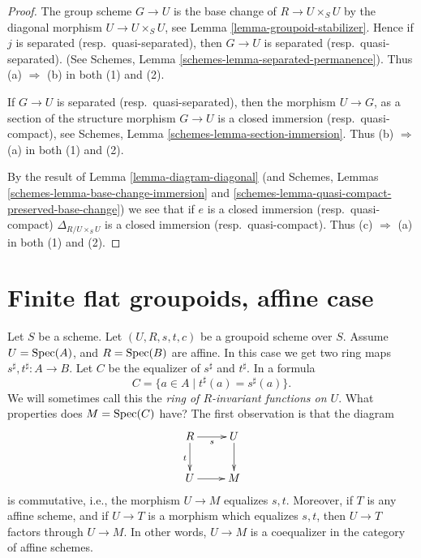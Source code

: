 \begin{proof}
The group scheme $G \to U$ is the base change of $R \to U \times_S U$
by the diagonal morphism $U \to U \times_S U$, see
Lemma \ref{lemma-groupoid-stabilizer}. Hence if
$j$ is separated (resp.\ quasi-separated),
then $G \to U$ is separated (resp.\ quasi-separated).
(See Schemes, Lemma
\ref{schemes-lemma-separated-permanence}).
Thus (a) $\Rightarrow$ (b) in both (1) and (2).

\medskip\noindent
If $G \to U$ is separated (resp.\ quasi-separated), then the morphism
$U \to G$, as a section of the structure morphism $G \to U$ is a closed
immersion (resp.\ quasi-compact), see
Schemes, Lemma \ref{schemes-lemma-section-immersion}.
Thus (b) $\Rightarrow$ (a) in both (1) and (2).

\medskip\noindent
By the result of
Lemma \ref{lemma-diagram-diagonal}
(and Schemes, Lemmas \ref{schemes-lemma-base-change-immersion}
and \ref{schemes-lemma-quasi-compact-preserved-base-change})
we see that if $e$ is a closed immersion (resp.\ quasi-compact)
$\Delta_{R/U \times_S U}$ is a closed
immersion (resp.\ quasi-compact).
Thus (c) $\Rightarrow$ (a) in both (1) and (2).
\end{proof}









\section{Finite flat groupoids, affine case}
\label{section-finite-flat}

\noindent
Let $S$ be a scheme.
Let $(U, R, s, t, c)$ be a groupoid scheme over $S$.
Assume $U = \mathop{\rm Spec}(A)$, and $R = \mathop{\rm Spec}(B)$ are affine.
In this case we get two ring maps
$s^\sharp, t^\sharp : A \longrightarrow B$.
Let $C$ be the equalizer of $s^\sharp$ and $t^\sharp$. In a formula
\begin{equation}
\label{equation-invariants}
C = \{a \in A \mid t^\sharp(a) = s^\sharp(a) \}.
\end{equation}
We will sometimes call this the {\it ring of $R$-invariant functions on $U$}.
What properties does $M = \mathop{\rm Spec}(C)$ have? The first observation is
that the diagram
$$
\xymatrix{
R \ar[r]_s \ar[d]_t & U \ar[d] \\
U \ar[r] & M
}
$$
is commutative, i.e., the morphism $U \to M$ equalizes $s, t$.
Moreover, if $T$ is any affine scheme, and if $U \to T$ is
a morphism which equalizes $s, t$, then $U \to T$ factors through $U \to M$.
In other words, $U \to M$ is a coequalizer in the category of affine schemes.


